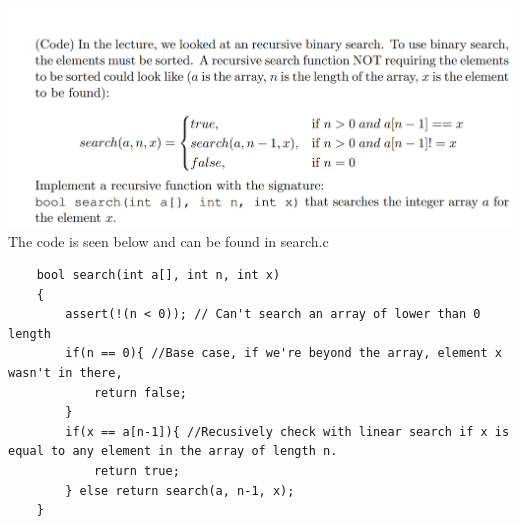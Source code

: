 \documentclass{article}
\begin{document}
\section{}
\includegraphics[width=\linewidth, keepaspectratio=true]{task3} 
The code is seen below and can be found in search.c
\begin{lstlisting}
    bool search(int a[], int n, int x)
    {
        assert(!(n < 0)); // Can't search an array of lower than 0 length
        if(n == 0){ //Base case, if we're beyond the array, element x wasn't in there,
            return false;
        }
        if(x == a[n-1]){ //Recusively check with linear search if x is equal to any element in the array of length n.
            return true;
        } else return search(a, n-1, x);
    }
\end{lstlisting}
\vspace{1cm}
\end{document}

